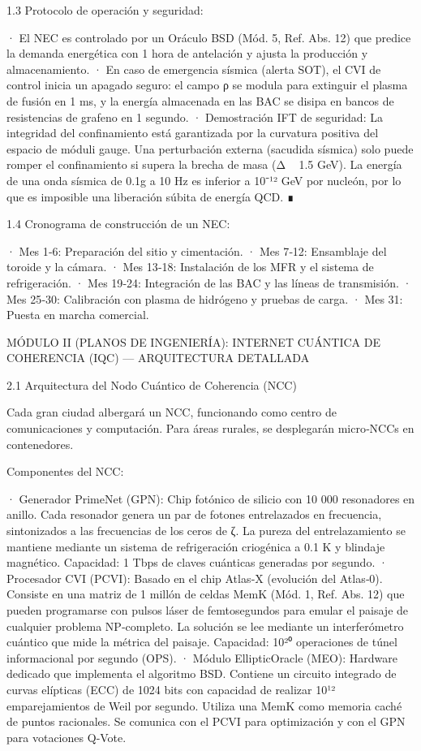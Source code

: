 \documentclass[12pt,a4paper]{book}
\begin{document}
1.3 Protocolo de operación y seguridad:

· El NEC es controlado por un Oráculo BSD (Mód. 5, Ref. Abs. 12) que predice la demanda energética con 1 hora de antelación y ajusta la producción y almacenamiento.
· En caso de emergencia sísmica (alerta SOT), el CVI de control inicia un apagado seguro: el campo ρ se modula para extinguir el plasma de fusión en 1 ms, y la energía almacenada en las BAC se disipa en bancos de resistencias de grafeno en 1 segundo.
· Demostración IFT de seguridad: La integridad del confinamiento está garantizada por la curvatura positiva del espacio de móduli gauge. Una perturbación externa (sacudida sísmica) solo puede romper el confinamiento si supera la brecha de masa (Δ ~ 1.5 GeV). La energía de una onda sísmica de 0.1g a 10 Hz es inferior a 10⁻¹² GeV por nucleón, por lo que es imposible una liberación súbita de energía QCD. ∎

1.4 Cronograma de construcción de un NEC:

· Mes 1‑6: Preparación del sitio y cimentación.
· Mes 7‑12: Ensamblaje del toroide y la cámara.
· Mes 13‑18: Instalación de los MFR y el sistema de refrigeración.
· Mes 19‑24: Integración de las BAC y las líneas de transmisión.
· Mes 25‑30: Calibración con plasma de hidrógeno y pruebas de carga.
· Mes 31: Puesta en marcha comercial.

MÓDULO II (PLANOS DE INGENIERÍA): INTERNET CUÁNTICA DE COHERENCIA (IQC) — ARQUITECTURA DETALLADA

2.1 Arquitectura del Nodo Cuántico de Coherencia (NCC)

Cada gran ciudad albergará un NCC, funcionando como centro de comunicaciones y computación. Para áreas rurales, se desplegarán micro‑NCCs en contenedores.

Componentes del NCC:

· Generador PrimeNet (GPN): Chip fotónico de silicio con 10 000 resonadores en anillo. Cada resonador genera un par de fotones entrelazados en frecuencia, sintonizados a las frecuencias de los ceros de ζ. La pureza del entrelazamiento se mantiene mediante un sistema de refrigeración criogénica a 0.1 K y blindaje magnético. Capacidad: 1 Tbps de claves cuánticas generadas por segundo.
· Procesador CVI (PCVI): Basado en el chip Atlas‑X (evolución del Atlas‑0). Consiste en una matriz de 1 millón de celdas MemK (Mód. 1, Ref. Abs. 12) que pueden programarse con pulsos láser de femtosegundos para emular el paisaje de cualquier problema NP‑completo. La solución se lee mediante un interferómetro cuántico que mide la métrica del paisaje. Capacidad: 10²⁰ operaciones de túnel informacional por segundo (OPS).
· Módulo EllipticOracle (MEO): Hardware dedicado que implementa el algoritmo BSD. Contiene un circuito integrado de curvas elípticas (ECC) de 1024 bits con capacidad de realizar 10¹² emparejamientos de Weil por segundo. Utiliza una MemK como memoria caché de puntos racionales. Se comunica con el PCVI para optimización y con el GPN para votaciones Q‑Vote.
\end{document}
